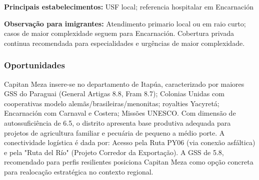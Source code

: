 \textbf{Principais estabelecimentos:} USF local; referencia hospitalar
em Encarnación

\textbf{Observação para imigrantes:} Atendimento primario local ou em
raio curto; casos de maior complexidade seguem para Encarnación.
Cobertura privada continua recomendada para especialidades e urgências
de maior complexidade.
\newpage

\subsubsection*{Oportunidades}\label{oport-capitan-meza-0704}
Capitan Meza insere-se no departamento de Itapúa, caracterizado por maiores GSS do Paraguai (General Artigas 8.8, Fram 8.7); Colonias Unidas com cooperativas modelo alemãs/brasileiras/menonitas; royalties Yacyretá; Encarnación com Carnaval e Costera; Missões UNESCO. Com dimensão de autossuficiência de 6.5, o distrito apresenta base produtiva adequada para projetos de agricultura familiar e pecuária de pequeno a médio porte. A conectividade logística é dada por: Acesso pela Ruta PY06 (via conexão asfáltica) e pela "Ruta del Río" (Projeto Corredor da Exportação). A GSS de 5.8, recomendado para perfis resilientes posiciona Capitan Meza como opção concreta para realocação estratégica no contexto regional.

